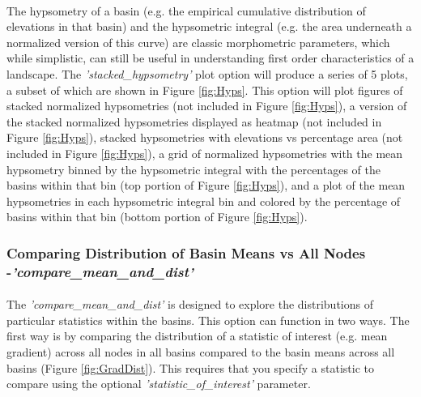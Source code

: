 \paragraph{}The hypsometry of a basin (e.g. the empirical cumulative distribution of elevations in that basin) and the hypsometric integral (e.g. the area underneath a normalized version of this curve) are classic morphometric parameters, which while simplistic, can still be useful in understanding first order characteristics of a landscape. The \textit{'stacked\_hypsometry'} plot option will produce a series of 5 plots, a subset of which are shown in Figure \ref{fig:Hyps}. This option will plot figures of stacked normalized hypsometries (not included in Figure \ref{fig:Hyps}), a version of the stacked normalized hypsometries displayed as heatmap (not included in Figure \ref{fig:Hyps}), stacked hypsometries with elevations vs percentage area (not included in Figure \ref{fig:Hyps}), a grid of normalized hypsometries with the mean hypsometry binned by the hypsometric integral with the percentages of the basins within that bin (top portion of Figure \ref{fig:Hyps}), and a plot of the mean hypsometries in each hypsometric integral bin and colored by the percentage of basins within that bin (bottom portion of Figure \ref{fig:Hyps}).



\subsubsection{Comparing Distribution of Basin Means vs All Nodes -\textit{'compare\_mean\_and\_dist'}} \label{sec:meanANDdist}
\paragraph{}The \textit{'compare\_mean\_and\_dist'} is designed to explore the distributions of particular statistics within the basins. This option can function in two ways. The first way is by comparing the distribution of a statistic of interest (e.g. mean gradient) across all nodes in all basins compared to the basin means across all basins (Figure \ref{fig:GradDist}). This requires that you specify a statistic to compare using the optional \textit{'statistic\_of\_interest'} parameter.

